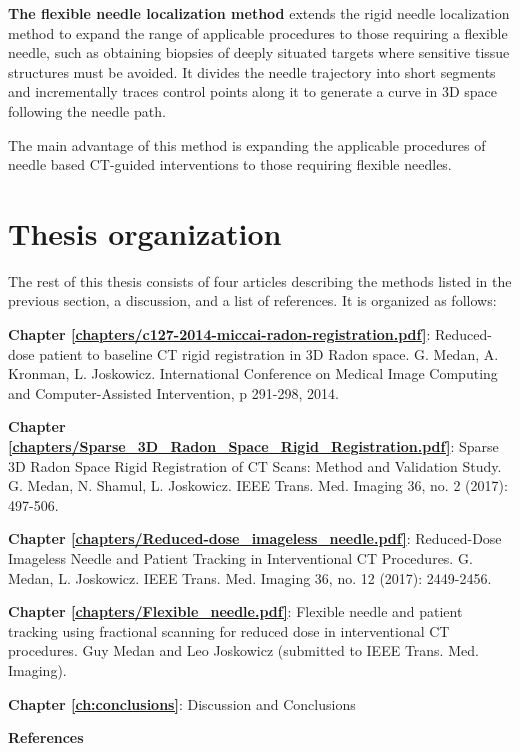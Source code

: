 \textbf{The flexible needle localization method} extends the rigid needle localization method to expand the range of applicable procedures to those requiring a flexible needle, such as obtaining biopsies of deeply situated targets where sensitive tissue structures must be avoided.
It divides the needle trajectory into short segments and incrementally traces control points along it to generate a curve in 3D space following the needle path.

The main advantage of this method is expanding the applicable procedures of needle based CT-guided interventions to those requiring flexible needles.


\section{Thesis organization}

The rest of this thesis consists of four articles describing the methods listed in the previous section, a discussion, and a list of references. It is organized as follows: 

\textbf{Chapter \ref{chapters/c127-2014-miccai-radon-registration.pdf}}: Reduced-dose patient to baseline CT rigid registration in 3D Radon space.
G. Medan, A. Kronman, L. Joskowicz. International Conference on Medical Image Computing and Computer-Assisted Intervention, p 291-298, 2014.

\textbf{Chapter \ref{chapters/Sparse_3D_Radon_Space_Rigid_Registration.pdf}}: Sparse 3D Radon Space Rigid Registration of CT Scans: Method and Validation Study.
G. Medan, N. Shamul, L. Joskowicz. IEEE Trans. Med. Imaging 36, no. 2 (2017): 497-506.

\textbf{Chapter \ref{chapters/Reduced-dose_imageless_needle.pdf}}: Reduced-Dose Imageless Needle and Patient Tracking in Interventional CT Procedures.
G. Medan, L. Joskowicz. IEEE Trans. Med. Imaging 36, no. 12 (2017): 2449-2456.

\textbf{Chapter \ref{chapters/Flexible_needle.pdf}}: Flexible needle and patient tracking using fractional scanning for reduced dose in interventional CT procedures. Guy Medan and Leo Joskowicz (submitted to IEEE Trans. Med. Imaging). %

\textbf{Chapter \ref{ch:conclusions}}: Discussion and Conclusions

\textbf{References}